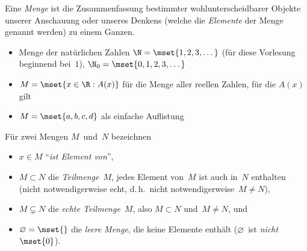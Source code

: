 \documentclass[a4paper]{article}
\begin{document}
\begin{definition}
    Eine \emph{Menge} ist die Zusammenfassung bestimmter wohlunterscheidbarer Objekte unserer Anschauung oder unseres Denkens (welche die \emph{Elemente} der Menge genannt werden) zu einem Ganzen.
\end{definition}

\begin{example}\leavevmode
    \begin{itemize}
        \item Menge der natürlichen Zahlen $\N = \mset{1, 2, 3, \dots}$ (für diese Vorlesung beginnend bei~$1$), $\N_0 = \mset{0, 1, 2, 3, \dots}$
        \item $M = \mset{x \in \R : A(x)}$ für die Menge aller reellen Zahlen, für die $A(x)$ gilt
        \item $M = \mset{a, b, c, d}$ als einfache Auflistung
    \end{itemize}
\end{example}

\begin{notation}
    Für zwei Mengen $M$~und~$N$ bezeichnen
    \begin{itemize}
        \item $x \in M$ "`\emph{ist Element von}"',
        \item $M \subset N$ die \emph{Teilmenge}~$M$, jedes Element von~$M$ ist auch in~$N$ enthalten (nicht notwendigerweise echt, d.\,h.\ nicht notwendigerweise~$M \neq N$),
        \item $M \subsetneq N$ die \emph{echte Teilmenge}~$M$, also $M \subset N$ und~$M \neq N$, und
        \item $\varnothing = \mset{}$ die \emph{leere Menge}, die keine Elemente enthält ($\varnothing$~ist \emph{nicht}~$\mset{0}$).
    \end{itemize}
\end{notation}
\end{document}

